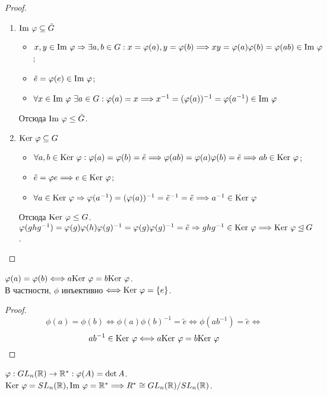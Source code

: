 \begin{proof}\tab
    \begin{enumerate}
        \item $\textup{Im }\phi \subseteq \tilde{G}$
        \begin{itemize}
            \item $x, y \in \textup{Im }\phi \Rightarrow \exists a, b \in G: x = \phi(a), y = \phi(b) \Longrightarrow xy = \phi(a)\phi(b) = \phi(ab) \in \textup{Im }\phi$;
            \item $\tilde{e} = \phi(e) \in \textup{Im }\phi$;
            \item $\forall x \in \textup{Im }\phi \ \exists a \in G: \phi(a) = x \Longrightarrow x^{-1} = (\phi(a))^{-1}= \phi(a^{-1}) \in \textup{Im }\phi$
        \end{itemize}
        Отсюда $\textup{Im } \phi \leq \tilde{G}$.
        \item $\textup{Ker }\phi \subseteq G$
        \begin{itemize}
            \item $\forall a, b \in \textup{Ker }\phi: \phi(a) = \phi(b) = \tilde{e} \Longrightarrow \phi(ab) = \phi(a)\phi(b) = \tilde{e} \Longrightarrow \newline ab \in \textup{Ker }\phi$;
            \item $\tilde{e} = \phi{e} \Longrightarrow e \in \textup{Ker }\phi$;
            \item $\forall a \in \textup{Ker }\phi \Rightarrow \phi(a^{-1}) = (\phi(a))^{-1} = \tilde{e}^{-1} = \tilde{e}  \Longrightarrow a^{-1} \in \textup{Ker }\phi$
        \end{itemize}
        Отсюда $\textup{Ker } \phi \leq G$.\\
        $\phi(ghg^{-1}) = \phi(g)\phi(h)\phi(g)^{-1} = \phi(g)\phi(g)^{-1} = \tilde{e} \Rightarrow ghg^{-1} \in \textup{Ker }\phi \Longrightarrow \textup{Ker }\phi \unlhd G$.
    \end{enumerate}
\end{proof}
\begin{subtheoremnum}
    $\phi(a) = \phi(b) \Longleftrightarrow a \textup{Ker }\phi = b \textup{Ker }\phi$.\\
    В частности, $\phi$ инъективно $\Longleftrightarrow \textup{Ker }\phi = \{e\}$. 
\end{subtheoremnum}
\begin{proof}
    \[\phi(a) = \phi(b) \Longleftrightarrow \phi(a)\phi(b)^{-1} = \tilde{e} \Longleftrightarrow \phi(ab^{-1}) = \tilde{e} \Longleftrightarrow\]
    \[ab^{-1} \in \textup{Ker }\phi \Longleftrightarrow a \textup{Ker }\phi = b \textup{Ker }\phi\]
\end{proof}
\begin{example}
    $\phi: GL_n(\R) \rightarrow \R^* : \phi(A) = \det A$.\\
    $\textup{Ker }\phi = SL_n(\R), \textup{Im }\phi = \R^* \Longrightarrow R^* \cong GL_n(\R) / SL_n(\R)$.
\end{example}
